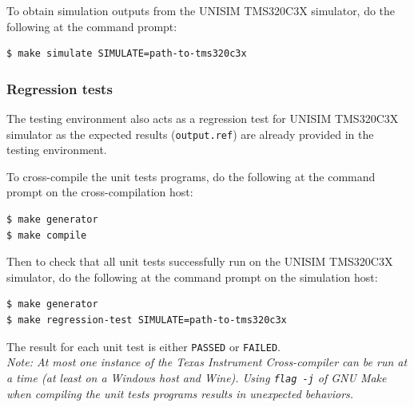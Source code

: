 \vspace{0.5cm}

To obtain simulation outputs from the UNISIM TMS320C3X simulator, do the following at the command prompt:
\begin{verbatim}
$ make simulate SIMULATE=path-to-tms320c3x
\end{verbatim}

\subsubsection{Regression tests}
\label{tms320c3x_regression_tests}

The testing environment also acts as a regression test for UNISIM TMS320C3X simulator as the expected results (\texttt{output.ref}) are already provided in the testing environment.

To cross-compile the unit tests programs, do the following at the command prompt on the cross-compilation host:
\begin{verbatim}
$ make generator
$ make compile
\end{verbatim}

Then to check that all unit tests successfully run on the UNISIM TMS320C3X simulator, do the following at the command prompt on the simulation host:
\begin{verbatim}
$ make generator
$ make regression-test SIMULATE=path-to-tms320c3x
\end{verbatim}

\noindent The result for each unit test is either \texttt{PASSED} or \texttt{FAILED}.\\

\textit{Note: At most one instance of the Texas Instrument Cross-compiler can be run at a time (at least on a Windows host and Wine).
Using \texttt{flag -j} of GNU Make when compiling the unit tests programs results in unexpected behaviors.}
